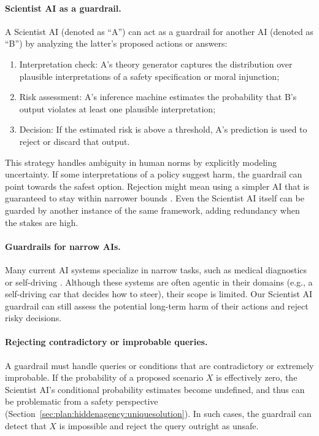 \paragraph{Scientist AI as a guardrail.} A Scientist AI (denoted as ``A'') can act as a guardrail for another AI (denoted as ``B'')  by analyzing the latter's proposed actions or answers:
\begin{enumerate}
    \item Interpretation check: A’s theory generator captures the distribution over plausible interpretations of a safety specification or moral injunction;  
    \item Risk assessment: A’s inference machine estimates the probability that B’s output violates at least one plausible interpretation;  
    \item Decision: If the estimated risk is above a threshold, A’s prediction is used to reject or discard that output.
\end{enumerate}

This strategy handles ambiguity in human norms by explicitly modeling uncertainty. If some interpretations of a policy suggest harm, the guardrail can point towards the safest option. Rejection might mean using a simpler AI that is guaranteed to stay within narrower bounds \cite{arxiv.org.abs.2405.06624}. Even the Scientist AI itself can be guarded by another instance of the same framework, adding redundancy when the stakes are high.

\paragraph{Guardrails for narrow AIs.} Many current AI systems specialize in narrow tasks, such as medical diagnostics \cite{genomemedicine.biomedcentral.com.articles.10.1186.s13073.019.0689.8} or self-driving \cite{www.sciencedirect.com.science.article.abs.pii.S095741742030628X}. Although these systems are often agentic in their domains (e.g., a self-driving car that decides how to steer), their scope is limited. Our Scientist AI guardrail can still assess the potential long-term harm of their actions and reject risky decisions.

\paragraph{Rejecting contradictory or improbable queries.} A guardrail must handle queries or conditions that are contradictory or extremely improbable. If the probability of a proposed scenario $X$ is effectively zero, the Scientist AI’s conditional probability estimates become undefined, and thus can be problematic from a safety perspective (Section~\ref{sec:plan:hiddenagency:uniquesolution}). In such cases, the guardrail can detect that $X$ is impossible and reject the query outright as unsafe.

